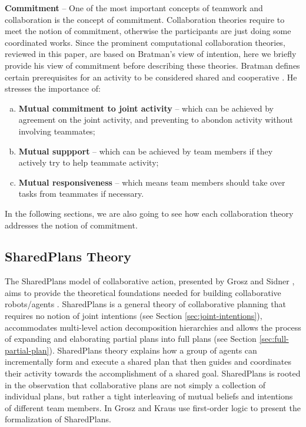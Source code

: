 \documentclass[11pt]{article}
\begin{document}
\textbf{Commitment} -- One of the most important concepts of teamwork and
collaboration is the concept of commitment. Collaboration theories require to
meet the notion of commitment, otherwise the participants are just doing some
coordinated works. Since the prominent computational collaboration theories,
reviewed in this paper, are based on Bratman's view of intention, here we
briefly provide his view of commitment before describing these theories. Bratman
defines certain prerequisites for an activity to be considered shared and
cooperative \cite{bratman:shared-activity}. He stresses the importance of:

\begin{enumerate}[a)]
  \item \textbf{Mutual commitment to joint activity} -- which can be achieved by
  agreement on the joint activity, and preventing to abondon activity without
  involving teammates;
  \item \textbf{Mutual suppport} -- which can be achieved by team members
  if they actively try to help teammate activity;
  \item \textbf{Mutual responsiveness} -- which means team members should take
  over tasks from teammates if necessary.
\end{enumerate}

In the following sections, we are also going to see how each collaboration
theory addresses the notion of commitment.

\subsection{SharedPlans Theory}
\label{sec:sharedplans}

The SharedPlans model of collaborative action, presented by Grosz and Sidner
\cite{grosz:planning-acting, grosz:collaboration, grosz:plans-discourse}, aims
to provide the theoretical foundations needed for building collaborative
robots/agents \cite{grosz:collaborative-systems}. SharedPlans is a general
theory of collaborative planning that requires no notion of joint intentions
(see Section \ref{sec:joint-intentions}), accommodates multi-level action
decomposition hierarchies and allows the process of expanding and elaborating
partial plans into full plans (see Section \ref{sec:full-partial-plan}).
SharedPlans theory explains how a group of agents can incrementally form and
execute a shared plan that then guides and coordinates their activity towards
the accomplishment of a shared goal. SharedPlans is rooted in the observation
that collaborative plans are not simply a collection of individual plans, but
rather a tight interleaving of mutual beliefs and intentions of different team
members. In \cite{grosz:collaboration} Grosz and Kraus use first-order logic to
present the formalization of SharedPlans.
\end{document}

